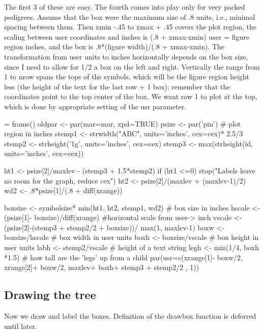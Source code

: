 \documentclass{article}
\begin{document}
The first 3 of these are easy.  The fourth comes into play only for very packed
pedigrees. Assume that the box were the maximum size of .8 units, i.e., minimal
spacing between them. Then xmin -.45 to xmax + .45 covers the plot region,
the scaling between user coordinates and inches is (.8 + xmax-xmin) user =
figure region inches, and the box is .8*(figure width)/(.8 + xmax-xmin).
The transformation from user units to inches horizontally depends on the box
size, since I need to allow for 1/2 a box on the left and right.  
Vertically the range from 1 to nrow spans the tops of the symbols, which 
will be the figure region height less (the height of the
text for the last row + 1 box); remember that the coordinates point to the
top center of the box.
We want row 1 to plot at the top, which is done by appropriate setting
of the usr parameter.
\begin{nwchunk}
=
 frame()
 oldpar <- par(mar=mar, xpd=TRUE)
 psize <- par('pin')  # plot region in inches
 stemp1 <- strwidth("ABC", units='inches', cex=cex)* 2.5/3
 stemp2 <- strheight('1g', units='inches', cex=cex)
 stemp3 <- max(strheight(id, units='inches', cex=cex))
 
 ht1 <- psize[2]/maxlev - (stemp3 + 1.5*stemp2)
 if (ht1 <=0) stop("Labels leave no room for the graph, reduce cex")
 ht2 <- psize[2]/(maxlev + (maxlev-1)/2)
 wd2 <- .8*psize[1]/(.8 + diff(xrange))
 
 boxsize <- symbolsize* min(ht1, ht2, stemp1, wd2) # box size in inches
 hscale <- (psize[1]- boxsize)/diff(xrange)  #horizontal scale from user-> inch
 vscale <- (psize[2]-(stemp3 + stemp2/2 + boxsize))/ max(1, maxlev-1)
 boxw  <- boxsize/hscale  # box width in user units
 boxh  <- boxsize/vscale   # box height in user units
 labh  <- stemp2/vscale   # height of a text string
 legh  <- min(1/4, boxh  *1.5)  # how tall are the 'legs' up from a child
 par(usr=c(xrange[1]- boxw/2, xrange[2]+ boxw/2, 
           maxlev+ boxh+ stemp3 + stemp2/2 , 1))
\end{nwchunk}

\subsection{Drawing the tree}
Now we draw and label the boxes.  Definition of the drawbox function is
deferred until later.
\end{document}
